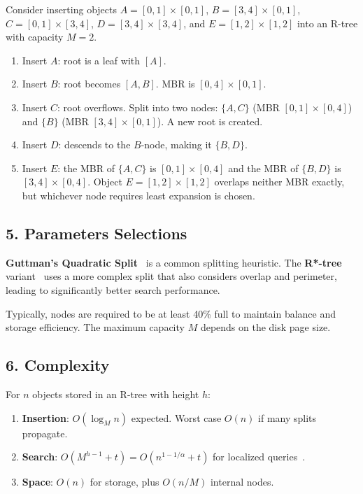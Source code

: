 \begin{example}
\label{ex:rt_insert}
Consider inserting objects $A=[0,1]\times[0,1]$, $B=[3,4]\times[0,1]$, $C=[0,1]\times[3,4]$, $D=[3,4]\times[3,4]$, and $E=[1,2]\times[1,2]$ into an R-tree with capacity $M=2$.
\begin{enumerate}
    \item Insert $A$: root is a leaf with $[A]$.
    \item Insert $B$: root becomes $[A, B]$. MBR is $[0,4]\times[0,1]$.
    \item Insert $C$: root overflows. Split into two nodes: $\{A, C\}$ (MBR $[0,1]\times[0,4]$) and $\{B\}$ (MBR $[3,4]\times[0,1]$). A new root is created.
    \item Insert $D$: descends to the $B$-node, making it $\{B, D\}$.
    \item Insert $E$: the MBR of $\{A,C\}$ is $[0,1]\times[0,4]$ and the MBR of $\{B,D\}$ is $[3,4]\times[0,4]$. Object $E=[1,2]\times[1,2]$ overlaps neither MBR exactly, but whichever node requires least expansion is chosen.
\end{enumerate}
\end{example}

\subsection{5. Parameters Selections}
\begin{definition}
\label{def:rt_split}
\textbf{Guttman's Quadratic Split}~\cite{guttman1984} is a common splitting heuristic. The \textbf{R*-tree} variant~\cite{beckmann1990} uses a more complex split that also considers overlap and perimeter, leading to significantly better search performance.
\end{definition}

\begin{definition}
\label{def:rt_capacity}
Typically, nodes are required to be at least 40\% full to maintain balance and storage efficiency. The maximum capacity $M$ depends on the disk page size.
\end{definition}

\subsection{6. Complexity}
\begin{theorem}
\label{thm:rt_complexity}
For $n$ objects stored in an R-tree with height $h$:
\begin{enumerate}
    \item \textbf{Insertion}: $O(\log_M n)$ expected. Worst case $O(n)$ if many splits propagate.
    \item \textbf{Search}: $O(M^{h-1} + t) = O(n^{1-1/\alpha} + t)$ for localized queries~\cite{guttman1984}.
    \item \textbf{Space}: $O(n)$ for storage, plus $O(n/M)$ internal nodes.
\end{enumerate}
\end{theorem}

